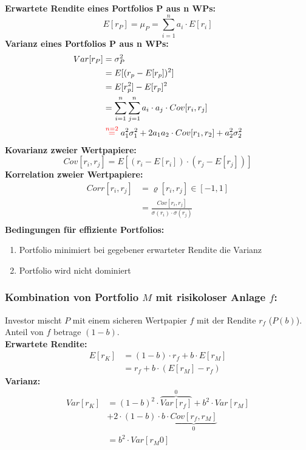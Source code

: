 \documentclass[leqno]{scrartcl}
\begin{document}
\begin{multicols}{4}
\textbf{Erwartete Rendite eines Portfolios P aus n WPs:}
  \begin{equation*}
    E[r_P] =\mu_P= \sum^{n}_{i=1} a_i \cdot E[r_i]
  \end{equation*}
\textbf{Varianz eines Portfolios P aus n WPs:}
  \begin{equation*}
    \begin{split}
      Var[r_P]&=\sigma_P^2\\
          &=E[(r_p-E[r_p])^2]\\
          &=E[r_p^2]-E[r_p]^2\\
          &=\sum^{n}_{i=1}\sum^{n}_{j=1}a_i \cdot a_j \cdot Cov[r_i,r_j]\\
          &\overset{\color{red}{n=2}}{=} a^2_1 \sigma^2_1 + 2a_1a_2 \cdot Cov[r_1,r_2] + a^2_2 \sigma^2_2
    \end{split}
  \end{equation*}
\textbf{Kovarianz zweier Wertpapiere:}
  \begin{equation*}
      Cov[r_i,r_j] = E[(r_i-E[r_i]) \cdot (r_j-E[r_j])]
  \end{equation*}
\textbf{Korrelation zweier Wertpapiere:}
  \begin{equation*}
    \begin{split}
      Corr[r_i,r_j] &= \varrho [r_i,r_j] \in [-1,1]\\
                    &= \frac{Cov[r_i,r_j]}{\sigma (r_i) \cdot \sigma (r_j)}\\
    \end{split}
  \end{equation*}
\textbf{Bedingungen für effiziente Portfolios:}
  \begin{enumerate}
    \item Portfolio minimiert bei gegebener erwarteter Rendite die Varianz
    \item Portfolio wird nicht dominiert
  \end{enumerate}
\subsubsection{Kombination von Portfolio $M$ mit risikoloser Anlage $f$:}
Investor mischt $P$ mit einem sicheren Wertpapier $f$ mit der Rendite $r_f$ ($P(b)$). Anteil von $f$ betrage $(1 - b)$.\\
\textbf{Erwartete Rendite:}
  \begin{equation*}
    \begin{split}
      E[r_K]&=(1-b) \cdot r_f + b \cdot E[r_M]\\
                 &=r_f + b \cdot (E[r_M ] - r_f)
    \end{split}
  \end{equation*}
\textbf{Varianz:}
  \begin{equation*}
    \begin{split}
      Var[r_K] &= (1-b)^2 \cdot \overbrace{Var[r_f]}^{0}+ b^2 \cdot Var[r_M]\\
               &+ 2 \cdot (1-b) \cdot b \cdot \underbrace{Cov[r_f ,r_M ]}_{0}\\
               &= b^2 \cdot Var[r_M0]
    \end{split}
  \end{equation*}

\end{multicols}
\end{document}
